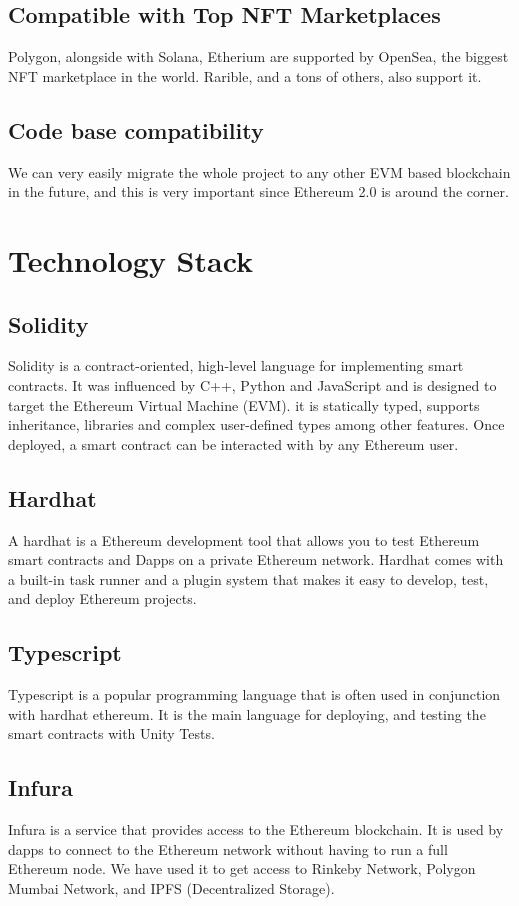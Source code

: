 \subsection{Compatible with Top NFT Marketplaces}
Polygon, alongside with Solana, Etherium are supported by OpenSea, the biggest NFT marketplace in the world. Rarible, and a tons of others, also support it.

\subsection{Code base compatibility}
We can very easily migrate the whole project to any other EVM based blockchain in the future, and this is very important since Ethereum 2.0 is around the corner.
 
 \section{Technology Stack}
\subsection{Solidity}
Solidity is a contract-oriented, high-level language for implementing smart contracts. It was influenced by C++, Python and JavaScript and is designed to target the Ethereum Virtual Machine (EVM). it is statically typed, supports inheritance, libraries and complex user-defined types among other features. Once deployed, a smart contract can be interacted with by any Ethereum user.

\subsection{Hardhat}
A hardhat is a Ethereum development tool that allows you to test Ethereum smart contracts and Dapps on a private Ethereum network. Hardhat comes with a built-in task runner and a plugin system that makes it easy to develop, test, and deploy Ethereum projects.

\subsection{Typescript}
Typescript is a popular programming language that is often used in conjunction with hardhat ethereum. It is the main language for deploying, and testing the smart contracts with Unity Tests.

\subsection{Infura}
Infura is a service that provides access to the Ethereum blockchain. It is used by dapps to connect to the Ethereum network without having to run a full Ethereum node. We have used it to get access to Rinkeby Network, Polygon Mumbai Network, and IPFS (Decentralized Storage).

